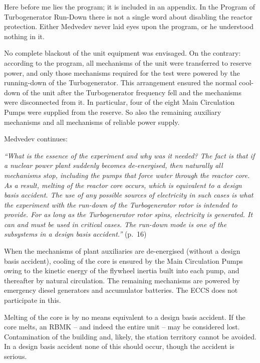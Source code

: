 \documentclass[openright]{bookest}
\begin{document}
Here before me lies the program; it is included in an appendix. In the Program of Turbogenerator Run-Down there is not a single word about disabling the reactor protection. Either Medvedev never laid eyes upon the program, or he understood nothing in it.

No complete blackout of the unit equipment was envisaged. On the contrary: according to the program, all mechanisms of the unit were transferred to reserve power, and only those mechanisms required for the test were powered by the running-down of the Turbogenerator. This arrangement ensured the normal cool-down of the unit after the Turbogenerator frequency fell and the mechanisms were disconnected from it. In particular, four of the eight Main Circulation Pumps were supplied from the reserve. So also the remaining auxiliary mechanisms and all mechanisms of reliable power supply.

Medvedev continues:

\begin{personal}
\textit{``What is the essence of the experiment and why was it needed? The fact is that if a nuclear power plant suddenly becomes de-energised, then naturally all mechanisms stop, including the pumps that force water through the reactor core. As a result, melting of the reactor core occurs, which is equivalent to a design basis accident. The use of any possible sources of electricity in such cases is what the experiment with the run-down of the Turbogenerator rotor is intended to provide. For as long as the Turbogenerator rotor spins, electricity is generated. It can and must be used in critical cases. The run-down mode is one of the subsystems in a design basis accident.''} (p.~16)
\end{personal}

When the mechanisms of plant auxiliaries are de-energised (without a design basis accident), cooling of the core is ensured by the Main Circulation Pumps owing to the kinetic energy of the flywheel inertia built into each pump, and thereafter by natural circulation. The remaining mechanisms are powered by emergency diesel generators and accumulator batteries. The ECCS does not participate in this.

Melting of the core is by no means equivalent to a design basis accident. If the core melts, an RBMK -- and indeed the entire unit -- may be considered lost. Contamination of the building and, likely, the station territory cannot be avoided. In a design basis accident none of this should occur, though the accident is serious.
\end{document}
